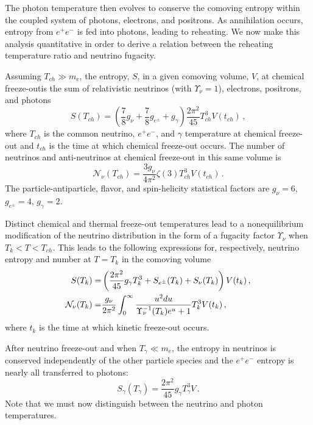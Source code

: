 The photon temperature then evolves to conserve the comoving entropy within the coupled system of photons, electrons, and positrons. As annihilation occurs, entropy from $e^+e^-$ is fed into photons, leading to reheating. We now make this analysis quantitative in order to derive a relation between the reheating temperature ratio and neutrino fugacity.

Assuming $T_{ch}\gg m_e$, the entropy, $S$, in a given comoving volume, $V$,  at chemical freeze-outis the sum of relativistic neutrinos (with $\Upsilon_\nu=1$), electrons, positrons, and photons
\begin{equation}
S(T_{ch})=\left(\frac{7}{8}g_\nu+\frac{7}{8}g_{e^\pm} +g_\gamma \right)\frac{2\pi^2}{45} T_{ch}^3V(t_{ch})\,,
\end{equation}
where $T_{ch}$ is the common neutrino, $e^+e^-$, and $\gamma$ temperature at chemical freeze-out and $t_{ch}$ is the time at which chemical freeze-out occurs. The number of neutrinos and anti-neutrinos at chemical freeze-out in this same volume is
\begin{equation}
\mathcal{N}_\nu(T_{ch})=\frac{3g_\nu}{4\pi^2}\zeta(3)T_{ch}^3V(t_{ch})\,.
\end{equation}
The particle-antiparticle, flavor, and spin-helicity statistical factors are $g_\nu=6$, $g_{e^\pm}=4$, $g_\gamma=2$.

Distinct chemical and thermal freeze-out temperatures lead to a nonequilibrium modification of the neutrino distribution in the form of a fugacity factor $\Upsilon_\nu$ when $T_k<T<T_{ch}$. This leads to the following expressions for, respectively, neutrino entropy and number at $T=T_k$ in the comoving volume
\begin{align}
S(T_k)=&\left(\frac{2\pi^2}{45}g_\gamma T_k^3+S_{e^\pm}(T_k)+S_{\nu}(T_k)\right)V(t_k)\,,\\
\mathcal{N}_{\nu}(T_k)=&\frac{g_\nu}{2\pi^2}\int_0^\infty \frac{u^2 du}{\Upsilon_\nu^{-1}(T_k)e^u+1}T_k^3V(t_k)\,,\notag
\end{align}
where $t_k$ is the time at which kinetic freeze-out occurs.

After neutrino freeze-out and when $T_{\gamma}\ll m_e$, the entropy in neutrinos is conserved independently of the other particle species and the $e^+e^-$ entropy is nearly all transferred to photons:
\begin{equation}
S_{\gamma}(T_\gamma)=\frac{2 \pi^2}{45}g_\gamma T_{\gamma}^3 V\,.
\end{equation}
 Note that we must now distinguish between the neutrino and photon temperatures.

